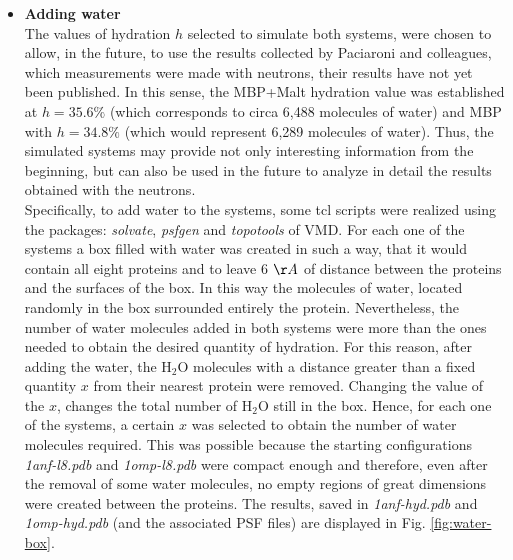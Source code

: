 \begin{itemize}
\item \textbf{Adding water}\\
The values of hydration $h$ selected to simulate both systems, were chosen to allow, in the future, to use the results collected by Paciaroni and colleagues, which measurements were made with neutrons, their results have not yet been published. In this sense, the MBP+Malt hydration value was established at $h = 35.6\%$  (which corresponds to circa 6,488 molecules of water) and MBP with $h = 34.8\%$ (which would represent 6,289 molecules of water).
Thus, the simulated systems may provide not only interesting information from the beginning, but can also be used in the future to analyze in detail the results obtained with the neutrons.\\
Specifically, to add water to the systems, some tcl scripts were realized using the packages: \textit{solvate}, \textit{psfgen} and \textit{topotools} of VMD. For each one of the systems a box filled with water was created in such a way, that it would contain all eight proteins and to leave 6 $\AA$ of distance between the proteins and the surfaces of the box. In this way the molecules of water, located randomly in the box surrounded entirely the protein. Nevertheless, the number of water molecules added in both systems were more than the ones needed to obtain the desired quantity of hydration. For this reason, after adding the water, the H$_2$O molecules with a distance greater than a fixed quantity $x$ from their nearest protein were removed. Changing the value of the $x$, changes the total number of H$_2$O still in the box. Hence, for each one of the systems, a certain $x$ was selected to obtain the number of water molecules required. This was possible because the starting configurations \textit{1anf-l8.pdb} and \textit{1omp-l8.pdb} were compact enough and therefore, even after the removal of some water molecules, no empty regions of great dimensions were created between the proteins. The results, saved in \textit{1anf-hyd.pdb} and \textit{1omp-hyd.pdb} (and the associated PSF files) are displayed in Fig. \ref{fig:water-box}.

\end{itemize}
